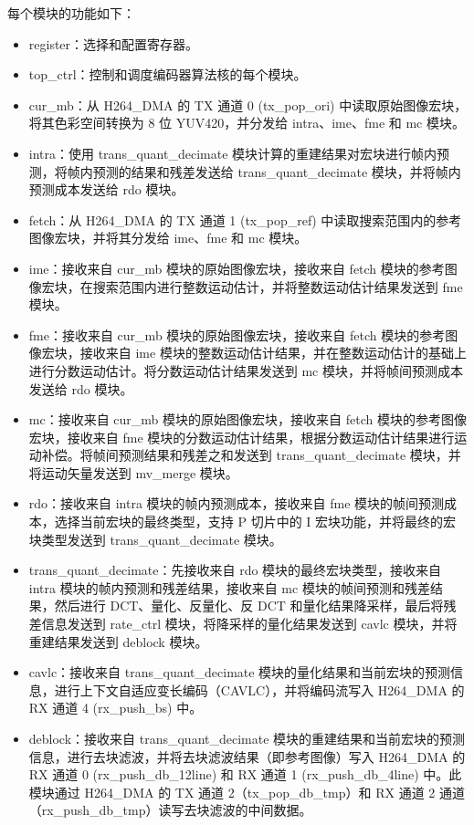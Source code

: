 \documentclass[main\_\_CN.tex]{subfiles}
\begin{document}
每个模块的功能如下：
\begin{itemize}
    \item register：选择和配置寄存器。
    \item top\_ctrl：控制和调度编码器算法核的每个模块。
    \item cur\_mb：从 H264\_DMA 的 TX 通道 0 (tx\_pop\_ori) 中读取原始图像宏块，将其色彩空间转换为 8 位 YUV420，并分发给 intra、ime、fme 和 mc 模块。
    \item intra：使用 trans\_quant\_decimate 模块计算的重建结果对宏块进行帧内预测，将帧内预测的结果和残差发送给 trans\_quant\_decimate 模块，并将帧内预测成本发送给 rdo 模块。
    \item fetch：从 H264\_DMA 的 TX 通道 1 (tx\_pop\_ref) 中读取搜索范围内的参考图像宏块，并将其分发给 ime、fme 和 mc 模块。
    \item ime：接收来自 cur\_mb 模块的原始图像宏块，接收来自 fetch 模块的参考图像宏块，在搜索范围内进行整数运动估计，并将整数运动估计结果发送到 fme 模块。
    \item fme：接收来自 cur\_mb 模块的原始图像宏块，接收来自 fetch 模块的参考图像宏块，接收来自 ime 模块的整数运动估计结果，并在整数运动估计的基础上进行分数运动估计。将分数运动估计结果发送到 mc 模块，并将帧间预测成本发送给 rdo 模块。
    \item mc：接收来自 cur\_mb 模块的原始图像宏块，接收来自 fetch 模块的参考图像宏块，接收来自 fme 模块的分数运动估计结果，根据分数运动估计结果进行运动补偿。将帧间预测结果和残差之和发送到 trans\_quant\_decimate 模块，并将运动矢量发送到 mv\_merge 模块。
    \item rdo：接收来自 intra 模块的帧内预测成本，接收来自 fme 模块的帧间预测成本，选择当前宏块的最终类型，支持 P 切片中的 I 宏块功能，并将最终的宏块类型发送到 trans\_quant\_decimate 模块。
    \item trans\_quant\_decimate：先接收来自 rdo 模块的最终宏块类型，接收来自 intra 模块的帧内预测和残差结果，接收来自 mc 模块的帧间预测和残差结果，然后进行 DCT、量化、反量化、反 DCT 和量化结果降采样，最后将残差信息发送到 rate\_ctrl 模块，将降采样的量化结果发送到 cavlc 模块，并将重建结果发送到 deblock 模块。
    \item cavlc：接收来自 trans\_quant\_decimate 模块的量化结果和当前宏块的预测信息，进行上下文自适应变长编码（CAVLC），并将编码流写入 H264\_DMA 的 RX 通道 4 (rx\_push\_bs) 中。
    \item deblock：接收来自 trans\_quant\_decimate 模块的重建结果和当前宏块的预测信息，进行去块滤波，并将去块滤波结果（即参考图像）写入 H264\_DMA 的 RX 通道 0 (rx\_push\_db\_12line) 和 RX 通道 1 (rx\_push\_db\_4line) 中。此模块通过 H264\_DMA 的 TX 通道 2（tx\_pop\_db\_tmp）和 RX 通道 2 通道（rx\_push\_db\_tmp）读写去块滤波的中间数据。

\end{itemize}
\end{document}
